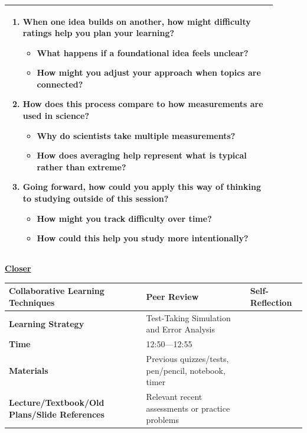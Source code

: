 \documentclass{article}
\begin{document}
\begin{flushleft}
\begin{tabular}{|p{0.9\linewidth}|}
\begin{enumerate}
    \item When one idea builds on another, how might difficulty ratings help you plan your learning?
    \begin{itemize}
        \item What happens if a foundational idea feels unclear?
        \item How might you adjust your approach when topics are connected?
    \end{itemize}

    \item How does this process compare to how measurements are used in science?
    \begin{itemize}
        \item Why do scientists take multiple measurements?
        \item How does averaging help represent what is typical rather than extreme?
    \end{itemize}

    \item Going forward, how could you apply this way of thinking to studying outside of this session?
    \begin{itemize}
        \item How might you track difficulty over time?
        \item How could this help you study more intentionally?
    \end{itemize}
\end{enumerate} \\
\hline
\end{tabular}




\newpage
\noindent
\textbf{\underline{Closer}}\\
\begin{tabular}{|p{4.2cm}|p{9.8cm}|}
\hline
\textbf{Collaborative Learning Techniques} & Peer Review & Self-Reflection \\
\hline
\textbf{Learning Strategy} & Test-Taking Simulation and Error Analysis \\
\hline
\textbf{Time} & 12:50---12:55 \\
\hline
\textbf{Materials} & Previous quizzes/tests, pen/pencil, notebook, timer \\
\hline
\textbf{Lecture/Textbook/Old Plans/Slide References} & Relevant recent assessments or practice problems \\
\hline
\end{tabular}


\end{flushleft}
\end{document}
